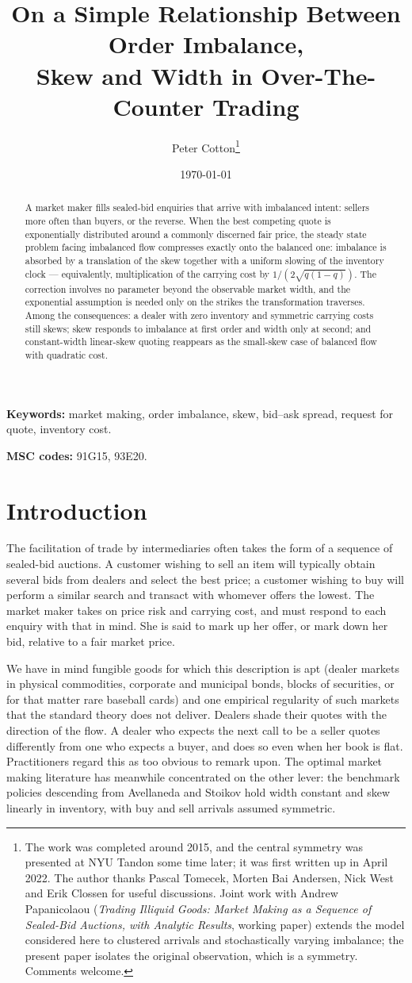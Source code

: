 \documentclass[11pt]{article}
\title{On a Simple Relationship Between Order Imbalance,\\ Skew and Width in Over-The-Counter Trading}
\author{Peter Cotton\thanks{The work was completed around 2015, and the central symmetry was presented at NYU Tandon some time later; it was first written up in April 2022. The author thanks Pascal Tomecek, Morten Bai Andersen, Nick West and Erik Clossen for useful discussions. Joint work with Andrew Papanicolaou (\emph{Trading Illiquid Goods: Market Making as a Sequence of Sealed-Bid Auctions, with Analytic Results}, working paper) extends the model considered here to clustered arrivals and stochastically varying imbalance; the present paper isolates the original observation, which is a symmetry. Comments welcome.}}
\date{\today}
\begin{document}
\maketitle

\begin{abstract}
A market maker fills sealed-bid enquiries that arrive with imbalanced intent: sellers more often than buyers, or the reverse. When the best competing quote is exponentially distributed around a commonly discerned fair price, the steady state problem facing imbalanced flow compresses exactly onto the balanced one: imbalance is absorbed by a translation of the skew together with a uniform slowing of the inventory clock --- equivalently, multiplication of the carrying cost by $1/(2\sqrt{q(1-q)})$. The correction involves no parameter beyond the observable market width, and the exponential assumption is needed only on the strikes the transformation traverses. Among the consequences: a dealer with zero inventory and symmetric carrying costs still skews; skew responds to imbalance at first order and width only at second; and constant-width linear-skew quoting reappears as the small-skew case of balanced flow with quadratic cost.
\end{abstract}

\medskip
\noindent\textbf{Keywords:} market making, order imbalance, skew, bid--ask spread, request for quote, inventory cost.

\noindent\textbf{MSC codes:} 91G15, 93E20.

\section{Introduction}

The facilitation of trade by intermediaries often takes the form of a sequence of sealed-bid auctions. A customer wishing to sell an item will typically obtain several bids from dealers and select the best price; a customer wishing to buy will perform a similar search and transact with whomever offers the lowest. The market maker takes on price risk and carrying cost, and must respond to each enquiry with that in mind. She is said to mark up her offer, or mark down her bid, relative to a fair market price.

We have in mind fungible goods for which this description is apt (dealer markets in physical commodities, corporate and municipal bonds, blocks of securities, or for that matter rare baseball cards) and one empirical regularity of such markets that the standard theory does not deliver. Dealers shade their quotes with the direction of the flow. A dealer who expects the next call to be a seller quotes differently from one who expects a buyer, and does so even when her book is flat. Practitioners regard this as too obvious to remark upon. The optimal market making literature has meanwhile concentrated on the other lever: the benchmark policies descending from Avellaneda and Stoikov \cite{avellaneda2008} hold width constant and skew linearly in inventory, with buy and sell arrivals assumed symmetric.
\end{document}
